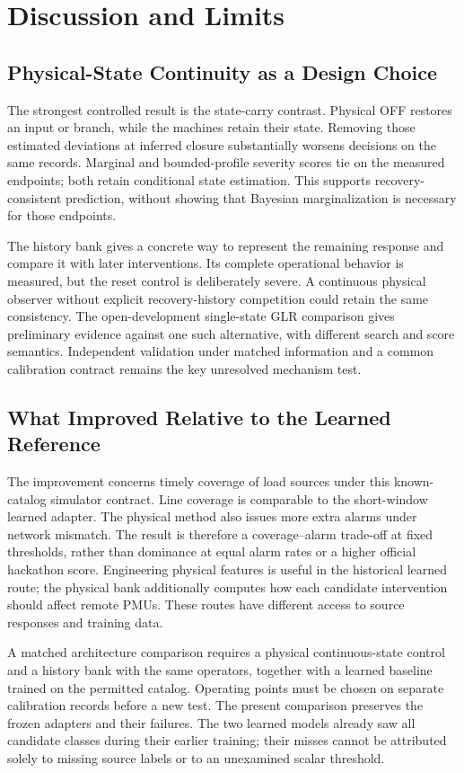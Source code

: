 \section{Discussion and Limits}
\label{sec:discussion}

\subsection{Physical-State Continuity as a Design Choice}
The strongest controlled result is the state-carry contrast. Physical OFF
restores an input or branch, while the machines retain their state.
Removing those estimated deviations at inferred closure substantially
worsens decisions on the same records. Marginal and bounded-profile
severity scores tie on the measured endpoints; both retain conditional
state estimation. This supports recovery-consistent prediction, without
showing that Bayesian marginalization is necessary for those endpoints.

The history bank gives a concrete way to represent the remaining response
and compare it with later interventions. Its complete operational behavior
is measured, but the reset control is deliberately severe. A continuous
physical observer without explicit recovery-history competition could
retain the same consistency. The open-development single-state GLR comparison gives preliminary
evidence against one such alternative, with different search and score
semantics. Independent validation under matched information and a common
calibration contract remains the key unresolved mechanism test.

\subsection{What Improved Relative to the Learned Reference}
The improvement concerns timely coverage of load sources under this
known-catalog simulator contract. Line coverage is comparable to the
short-window learned adapter. The physical method also issues more extra
alarms under network mismatch. The result is therefore a coverage--alarm
trade-off at fixed thresholds, rather than dominance at equal alarm rates
or a higher official hackathon score. Engineering physical features is
useful in the historical learned route; the physical bank additionally
computes how each candidate intervention should affect remote PMUs.
These routes have different access to source responses and training data.

A matched architecture comparison requires a physical continuous-state
control and a history bank with the same operators, together with a learned
baseline trained on the permitted catalog. Operating points must be chosen
on separate calibration records before a new test. The present comparison
preserves the frozen adapters and their failures. The two learned models
already saw all candidate classes during their earlier training; their
misses cannot be attributed solely to missing source labels or to an
unexamined scalar threshold.

